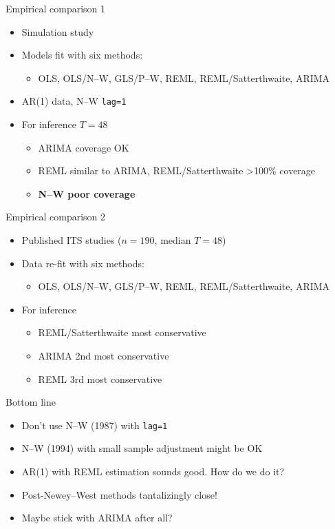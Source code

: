 \documentclass[aspectratio=169,12pt]{beamer} %
\begin{document}
\begin{frame}{Empirical comparison 1}
	\begin{itemize}
		\item Simulation study
		\citep{turner_evaluation_2020}
		\item Models fit with six methods:
		\begin{itemize}
			\item OLS, OLS/N--W, GLS/P--W, REML, REML/Satterthwaite, ARIMA
		\end{itemize}
		\item AR(1) data, N--W \texttt{lag=1}
		\item For inference \( T=48 \)
		\begin{itemize}
			\item ARIMA coverage OK
			\item REML similar to ARIMA, REML/Satterthwaite >100\% coverage
			\item \textbf{N--W poor coverage}
		\end{itemize}
	\end{itemize}
\end{frame}

\begin{frame}{Empirical comparison 2}
	\begin{itemize}
		\item Published ITS studies (\( n=190 \), median \(T=48\))
		\citep{turner_comparison_2020}
		\item Data re-fit with six methods:
		\begin{itemize}
			\item OLS, OLS/N--W, GLS/P--W, REML, REML/Satterthwaite, ARIMA
		\end{itemize}
		\item For inference
		\begin{itemize}
			\item REML/Satterthwaite most conservative
			\item ARIMA 2nd most conservative
			\item REML 3rd most conservative
		\end{itemize}
	\end{itemize}
\end{frame}

\begin{frame}{Bottom line}
    \begin{itemize}
        \item Don't use N--W (1987) with \texttt{lag=1}
        \item N--W (1994) with small sample adjustment might be OK
		\item AR(1) with REML estimation sounds good. How do we do it?
        \item Post-Newey--West methods tantalizingly close!
		\item Maybe stick with ARIMA after all?
    \end{itemize}
\end{frame}
\end{document}
